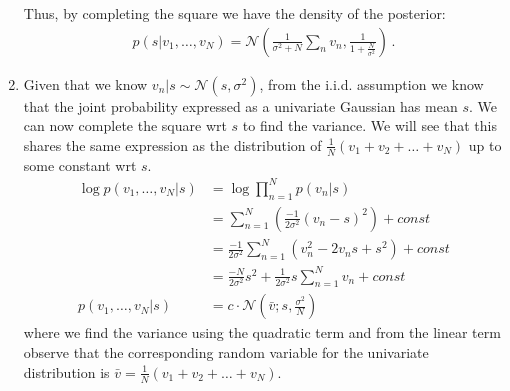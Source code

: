 \begin{enumerate}[label=\alph*.]
Thus, by completing the square we have the density of the posterior:
\begin{align}p(s|v_1,\dots,v_N) = \mathcal{N}(\frac{1}{\sigma^2 + N}\sum_{n}v_n, \frac{1}{1 + \frac{N}{\sigma^2}})\,.\end{align}

\item Given that we know $v_n|s \sim \mathcal{N}(s, \sigma^2)$, from the i.i.d. assumption we know that the joint probability expressed as a univariate Gaussian has mean $s$. We can now complete the square wrt $s$ to find the variance. We will see that this shares the same expression as the distribution of $\frac{1}{N}(v_1 +  v_2 + \dots + v_N)$ up to some constant wrt $s$.
\begin{align*}
\log p(v_1, \dots, v_N|s) &= \log \prod_{n=1}^N p(v_n|s) \\
&= \sum_{n=1}^N \left(\frac{-1}{2\sigma^2}(v_n - s)^2\right) + const\\
&= \frac{-1}{2\sigma^2}\sum_{n=1}^N \left(v_n^2 - 2v_n s + s^2\right) + const\\
&= \frac{-N}{2\sigma^2}s^2 + \frac{1}{2\sigma^2}s \sum_{n=1}^Nv_n + const\\
p(v_1, \dots, v_N|s) &= c\cdot\mathcal{N}(\bar{v}; s, \frac{\sigma^2}{N})
\end{align*}
where we find the variance using the quadratic term and from the linear term observe that the corresponding random variable for the univariate distribution is $\bar{v} = \frac{1}{N}(v_1 +  v_2 + \dots + v_N)$.


\end{enumerate}
